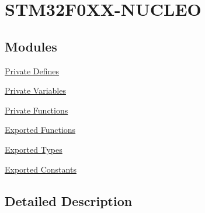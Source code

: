 \hypertarget{group___s_t_m32_f0_x_x___n_u_c_l_e_o}{}\section{S\+T\+M32\+F0\+X\+X-\/\+N\+U\+C\+L\+EO}
\label{group___s_t_m32_f0_x_x___n_u_c_l_e_o}
\subsection*{Modules}
\begin{DoxyCompactItemize}
\item 
\hyperlink{group___s_t_m32_f0_x_x___n_u_c_l_e_o___private___defines}{Private Defines}
\item 
\hyperlink{group___s_t_m32_f0_x_x___n_u_c_l_e_o___private___variables}{Private Variables}
\item 
\hyperlink{group___s_t_m32_f0_x_x___n_u_c_l_e_o___private___functions}{Private Functions}
\item 
\hyperlink{group___s_t_m32_f0_x_x___n_u_c_l_e_o___exported___functions}{Exported Functions}
\item 
\hyperlink{group___s_t_m32_f0_x_x___n_u_c_l_e_o___exported___types}{Exported Types}
\item 
\hyperlink{group___s_t_m32_f0_x_x___n_u_c_l_e_o___exported___constants}{Exported Constants}
\end{DoxyCompactItemize}


\subsection{Detailed Description}
